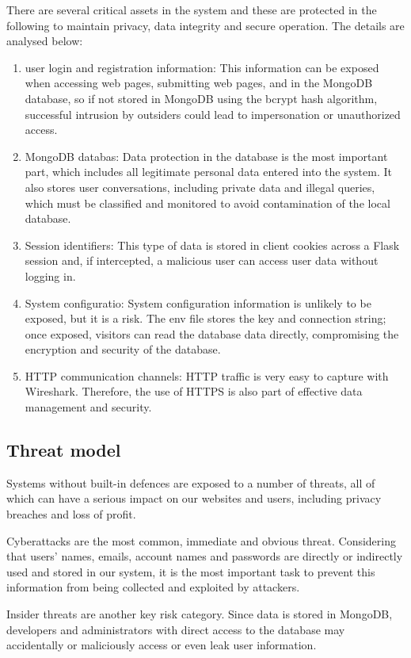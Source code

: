 \documentclass{article}
\begin{document}
There are several critical assets in the system and these are protected in the following to maintain privacy, data integrity and secure operation. The details are analysed below:

\begin{enumerate}
    \item user login and registration information: This information can be exposed when accessing web pages, submitting web pages, and in the MongoDB database, so if not stored in MongoDB using the bcrypt hash algorithm, successful intrusion by outsiders could lead to impersonation or unauthorized access.
    \item MongoDB databas: Data protection in the database is the most important part, which includes all legitimate personal data entered into the system. It also stores user conversations, including private data and illegal queries, which must be classified and monitored to avoid contamination of the local database.
    \item Session identifiers: This type of data is stored in client cookies across a Flask session and, if intercepted, a malicious user can access user data without logging in.
    \item System configuratio: System configuration information is unlikely to be exposed, but it is a risk. The env file stores the key and connection string; once exposed, visitors can read the database data directly, compromising the encryption and security of the database.
    \item HTTP communication channels: HTTP traffic is very easy to capture with Wireshark. Therefore, the use of HTTPS is also part of effective data management and security.
\end{enumerate}

\subsection{Threat model}
Systems without built-in defences are exposed to a number of threats, all of which can have a serious impact on our websites and users, including privacy breaches and loss of profit. 

Cyberattacks are the most common, immediate and obvious threat. Considering that users' names, emails, account names and passwords are directly or indirectly used and stored in our system, it is the most important task to prevent this information from being collected and exploited by attackers. 

Insider threats are another key risk category. Since data is stored in MongoDB, developers and administrators with direct access to the database may accidentally or maliciously access or even leak user information. 
\end{document}
